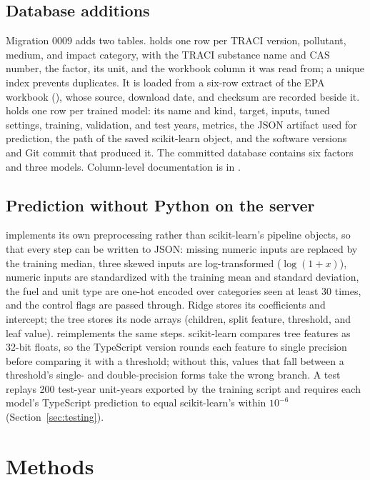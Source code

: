 \documentclass[11pt,a4paper]{article}
\begin{document}
\subsection{Database additions}

Migration 0009 adds two tables.  holds one row per TRACI version,
pollutant, medium, and impact category, with the TRACI substance name and CAS number, the factor,
its unit, and the workbook column it was read from; a unique index prevents duplicates. It is
loaded from a six-row extract of the EPA workbook (), whose
source, download date, and checksum are recorded beside it.  holds one row per
trained model: its name and kind, target, inputs, tuned settings, training, validation, and test
years, metrics, the JSON artifact used for prediction, the path of the saved scikit-learn object,
and the software versions and Git commit that produced it. The committed database contains six
factors and three models. Column-level documentation is in .

\subsection{Prediction without Python on the server}

 implements its own preprocessing rather than scikit-learn's pipeline
objects, so that every step can be written to JSON: missing numeric inputs are replaced by the
training median, three skewed inputs are log-transformed ($\log(1 + x)$), numeric inputs are
standardized with the training mean and standard deviation, the fuel and unit type are one-hot
encoded over categories seen at least 30 times, and the control flags are passed through. Ridge
stores its coefficients and intercept; the tree stores its node arrays (children, split feature,
threshold, and leaf value).  reimplements the same steps. scikit-learn
compares tree features as 32-bit floats, so the TypeScript version rounds each feature to
single precision before comparing it with a threshold; without this, values that fall between a
threshold's single- and double-precision forms take the wrong branch. A test replays 200
test-year unit-years exported by the training script and requires each model's TypeScript
prediction to equal scikit-learn's within $10^{-6}$ (Section~\ref{sec:testing}).

\section{Methods}
\label{sec:methods}
\end{document}
